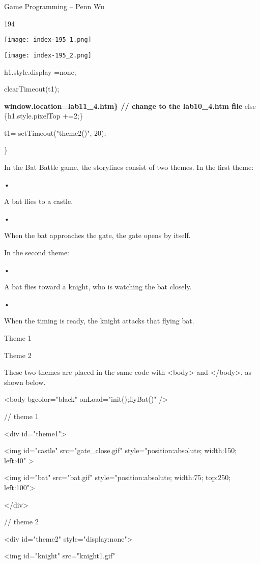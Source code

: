 \documentclass[
]{article}
\begin{document}
Game Programming -- Penn Wu

194

\protect\hypertarget{index_split_011.htmlux5cux23p195}{}{}\texttt{[image: index-195\_1.png]}

\texttt{[image: index-195\_2.png]}

h1.style.display =\textquotesingle none\textquotesingle;

clearTimeout(t1);

\textbf{window.location=\textquotesingle lab11\_4.htm\textquotesingle\}
// change to the lab10\_4.htm file} else \{h1.style.pixelTop +=2;\}

t1= setTimeout("theme2()", 20);

\}

In the Bat Battle game, the storylines consist of two themes. In the
first theme:

•

A bat flies to a castle.

•

When the bat approaches the gate, the gate opens by itself.

In the second theme:

•

A bat flies toward a knight, who is watching the bat closely.

•

When the timing is ready, the knight attacks that flying bat.

Theme 1

Theme 2

These two themes are placed in the same code with
\textless body\textgreater{} and \textless/body\textgreater, as shown
below.

\textless body bgcolor="black" onLoad="init();flyBat()" /\textgreater{}

// theme 1

\textless div id="theme1"\textgreater{}

\textless img id="castle" src="gate\_close.gif"
style="position:absolute; width:150; left:40" \textgreater{}

\textless img id="bat" src="bat.gif" style="position:absolute; width:75;
top:250; left:100"\textgreater{}

\textless/div\textgreater{}

// theme 2

\textless div id="theme2" style="display:none"\textgreater{}

\textless img id="knight" src="knight1.gif"
\end{document}
